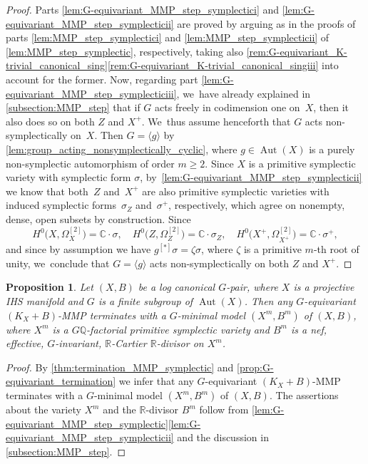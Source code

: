 \documentclass[JEP,XML,SOM,Unicode,published]{cedram}
\theoremstyle{plain}
\newtheorem{prop}[thm]{Proposition}
\theoremstyle{definition}
\newcommand{\Q}{\mathbb{Q}}
\newcommand{\R}{\mathbb{R}}
\newcommand{\C}{\mathbb{C}}
\DeclareMathOperator{\Aut}{Aut}
\begin{document}
\begin{proof}
Parts \eqref{lem:G-equivariant_MMP_step_symplectici} and \eqref{lem:G-equivariant_MMP_step_symplecticii} are proved by arguing as in the proofs of parts \eqref{lem:MMP_step_symplectici} and \eqref{lem:MMP_step_symplecticii} of \autoref{lem:MMP_step_symplectic}, respectively, taking also \autoref{rem:G-equivariant_K-trivial_canonical_sing}\eqref{rem:G-equivariant_K-trivial_canonical_singiii} into account for the former.
Now, regarding part \eqref{lem:G-equivariant_MMP_step_symplecticiii}, we~have already explained in \autoref{subsection:MMP_step} that if $G$ acts freely in codimension one on~$X$, then it also does so on both $Z$ and $X^+$. We~thus assume henceforth that $G$ acts non-symplectically on~$X$. Then $G = \langle g \rangle$ by \autoref{lem:group_acting_nonsymplectically_cyclic},
where $g \in \Aut(X)$ is a purely non-symplectic automorphism of order $m \geq 2$. Since $X$ is a primitive symplectic variety with symplectic form $\sigma$, by~\eqref{lem:G-equivariant_MMP_step_symplecticii} we know that both~$Z$ and~$X^+$ are also primitive symplectic varieties with induced symplectic forms~$\sigma_Z$ and~$\sigma^+$, respectively, which agree on nonempty, dense, open subsets by construction. Since
\[
H^0 \bigl(X,\Omega_{X}^{[2]} \bigr) = \C \cdot \sigma, \quad H^0 \bigl(Z,\Omega_{Z}^{[2]} \bigr) = \C \cdot \sigma_Z, \quad H^0 \bigl(X^+,\Omega_{X^+}^{[2]} \bigr) = \C \cdot \sigma^+,
\]
and since by assumption we have $g^{[*]} \sigma = \zeta \sigma $, where $\zeta$ is a primitive $m$-th root of unity, we~conclude that $G = \langle g \rangle$ acts non-symplectically on both $Z$ and $X^+$.
\end{proof}

\begin{prop}
\label{prop:IHS_G-equivariant_termination}
Let $(X,B)$ be a log canonical $G$\nobreakdash-pair, where $X$ is a projective IHS manifold and $G$ is a finite subgroup of $\Aut(X)$. Then any $G$\nobreakdash-equivariant \hbox{$(K_X+B)$}-MMP terminates with a $G$\nobreakdash-minimal model $(X^m, B^m)$ of $(X,B)$, where $X^m$ is a $G\Q$-factorial primitive symplectic variety and $B^m$ is a nef, effective, $G$\nobreakdash-invariant, $\R$-Cartier $\R$\nobreakdash-divisor on $X^m$.
\end{prop}

\begin{proof}
By \autoref{thm:termination_MMP_symplectic} and \autoref{prop:G-equivariant_termination} we infer that any $G$\nobreakdash-equivariant \hbox{$(K_X+B)$}-MMP terminates with a $G$\nobreakdash-minimal model $(X^m, B^m)$ of $(X,B)$. The assertions about the variety $X^m$ and the $\R$\nobreakdash-divisor $B^m$ follow from \autoref{lem:G-equivariant_MMP_step_symplectic}\eqref{lem:G-equivariant_MMP_step_symplecticii} and the discussion in \autoref{subsection:MMP_step}.
\end{proof}
\end{document}
